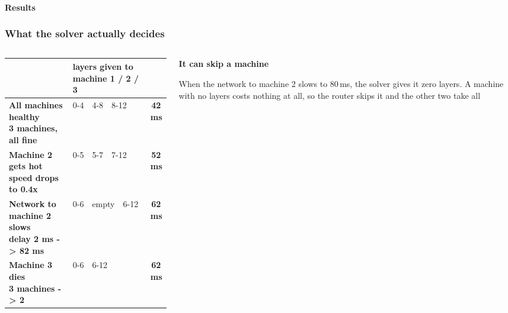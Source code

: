 \documentclass[aspectratio=169,11pt]{beamer}
\begin{document}
\begin{frame}[shrink=20]
  \framesubtitle{Results}
  \frametitle{What the solver actually decides}
  \begin{columns}[T]
  \begin{column}{0.58\textwidth}\footnotesize
    \setcellgapes{4pt}\makegapedcells
    \begin{tabular}{@{}llr@{}}
      & {\tiny\color{kemuted}layers given to machine 1 / 2 / 3} & \\
      \midrule
      \makecell[tl]{\bfseries\color{keink}All machines healthy\\
        {\tiny\ttfamily\color{kemuted}3 machines, all fine}} &
        {\ttfamily\scriptsize 0-4\ \ 4-8\ \ 8-12} &
        {\headfont\color{keteal}\bfseries 42\,ms}\\
      \makecell[tl]{\bfseries\color{keink}Machine 2 gets hot\\
        {\tiny\ttfamily\color{kemuted}speed drops to 0.4x}} &
        {\ttfamily\scriptsize 0-5\ \ 5-7\ \ 7-12} &
        {\headfont\color{keamber}\bfseries 52\,ms}\\
      \makecell[tl]{\bfseries\color{keink}Network to machine 2 slows\\
        {\tiny\ttfamily\color{kemuted}delay 2 ms -> 82 ms}} &
        {\ttfamily\scriptsize 0-6\ \ \textcolor{kemuted}{empty}\ \ 6-12} &
        {\headfont\color{keamber}\bfseries 62\,ms}\\
      \makecell[tl]{\bfseries\color{keink}Machine 3 dies\\
        {\tiny\ttfamily\color{kemuted}3 machines -> 2}} &
        {\ttfamily\scriptsize 0-6\ \ 6-12} &
        {\headfont\color{keamber}\bfseries 62\,ms}\\
      \bottomrule
    \end{tabular}
  \end{column}
  \begin{column}{0.38\textwidth}
    \colorbox{keink}{\begin{minipage}{\dimexpr\textwidth-14pt\relax}
      \vspace{0.3em}
      {\footnotesize\bfseries\color{keamber}It can skip a machine}\par\vspace{0.4em}
      {\scriptsize\color{white!65!keink}When the network to machine 2 slows
       to 80\,ms, the solver gives it zero layers. A machine with no layers
       costs nothing at all, so the router skips it and the other two take all
}
\end{minipage}}
\end{column}
\end{columns}
\end{frame}
\end{document}
